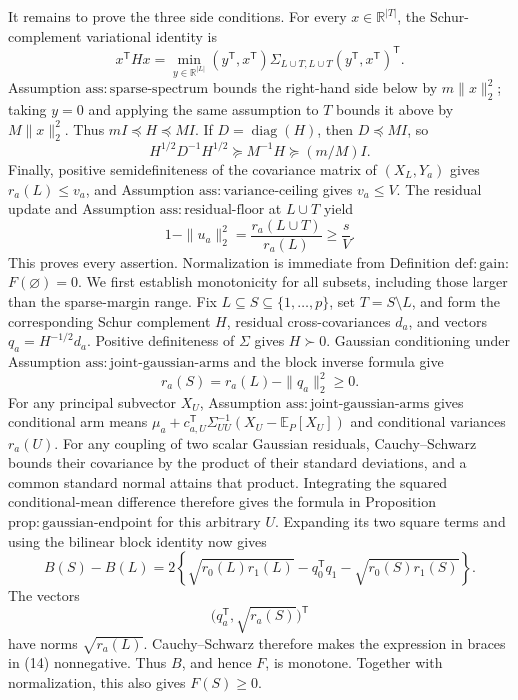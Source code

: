 It remains to prove the three side conditions. For every \(x\in\mathbb R^{|T|}\), the Schur-complement variational identity is
\[
 x^{\mathsf T}Hx
 =\min_{y\in\mathbb R^{|L|}}
 (y^{\mathsf T},x^{\mathsf T})
 \Sigma_{L\cup T,L\cup T}(y^{\mathsf T},x^{\mathsf T})^{\mathsf T}.
\]
Assumption \(\mathrm{ass{:}sparse\text{-}spectrum}\) bounds the right-hand side below by \(m\|x\|_2^2\); taking \(y=0\) and applying the same assumption to \(T\) bounds it above by \(M\|x\|_2^2\). Thus \(mI\preceq H\preceq MI\). If \(D=\operatorname{diag}(H)\), then \(D\preceq MI\), so
\[
 H^{1/2}D^{-1}H^{1/2}\succeq M^{-1}H\succeq(m/M)I.
\]
Finally, positive semidefiniteness of the covariance matrix of \((X_L,Y_a)\) gives \(r_a(L)\le v_a\), and Assumption \(\mathrm{ass{:}variance\text{-}ceiling}\) gives \(v_a\le V\). The residual update and Assumption \(\mathrm{ass{:}residual\text{-}floor}\) at \(L\cup T\) yield
\[
 1-\|u_a\|_2^2
 =\frac{r_a(L\cup T)}{r_a(L)}
 \ge\frac{s}{V}.
\]
This proves every assertion.
Normalization is immediate from Definition \(\mathrm{def{:}gain}\): \(F(\varnothing)=0\). We first establish monotonicity for all subsets, including those larger than the sparse-margin range. Fix \(L\subseteq S\subseteq\{1,\ldots,p\}\), set \(T=S\setminus L\), and form the corresponding Schur complement \(H\), residual cross-covariances \(d_a\), and vectors \(q_a=H^{-1/2}d_a\). Positive definiteness of \(\Sigma\) gives \(H\succ0\). Gaussian conditioning under Assumption \(\mathrm{ass{:}joint\text{-}gaussian\text{-}arms}\) and the block inverse formula give
\[
 r_a(S)=r_a(L)-\|q_a\|_2^2\ge0.
\]
For any principal subvector \(X_U\), Assumption \(\mathrm{ass{:}joint\text{-}gaussian\text{-}arms}\) gives conditional arm means \(\mu_a+c_{a,U}^{\mathsf T}\Sigma_{UU}^{-1}(X_U-\mathbb E_P[X_U])\) and conditional variances \(r_a(U)\). For any coupling of two scalar Gaussian residuals, Cauchy--Schwarz bounds their covariance by the product of their standard deviations, and a common standard normal attains that product. Integrating the squared conditional-mean difference therefore gives the formula in Proposition \(\mathrm{prop{:}gaussian\text{-}endpoint}\) for this arbitrary \(U\). Expanding its two square terms and using the bilinear block identity now gives
\[
 B(S)-B(L)=2\left\{\sqrt{r_0(L)r_1(L)}
 -q_0^{\mathsf T}q_1-\sqrt{r_0(S)r_1(S)}\right\}. \tag{14}
\]
The vectors
\[
 \bigl(q_a^{\mathsf T},\sqrt{r_a(S)}\bigr)^{\mathsf T}
\]
have norms \(\sqrt{r_a(L)}\). Cauchy--Schwarz therefore makes the expression in braces in (14) nonnegative. Thus \(B\), and hence \(F\), is monotone. Together with normalization, this also gives \(F(S)\ge0\).

